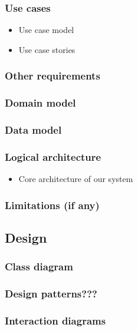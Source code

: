 \documentclass[11pt]{article}
\begin{document}
\subsubsection{Use cases}
\label{sec-1-2-2}

\begin{itemize}
\item Use case model
\item Use case stories
\end{itemize}
\subsubsection{Other requirements}
\label{sec-1-2-3}
\subsubsection{Domain model}
\label{sec-1-2-4}
\subsubsection{Data model}
\label{sec-1-2-5}
\subsubsection{Logical architecture}
\label{sec-1-2-6}

\begin{itemize}
\item Core architecture of our system
\end{itemize}
\subsubsection{Limitations (if any)}
\label{sec-1-2-7}
\subsection{Design}
\label{sec-1-3}
\subsubsection{Class diagram}
\label{sec-1-3-1}
\subsubsection{Design patterns???}
\label{sec-1-3-2}
\subsubsection{Interaction diagrams}
\label{sec-1-3-3}
\end{document}
